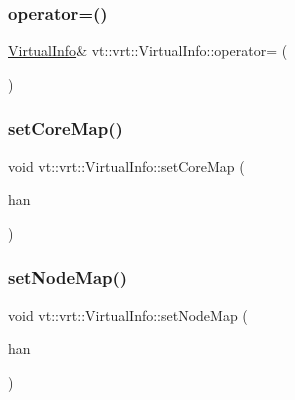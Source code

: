 \mbox{\label{structvt_1_1vrt_1_1_virtual_info_a63b12c1dfcbc3c6d34be9100c704dd81}} 
\subsubsection{\texorpdfstring{operator=()}{operator=()}}
{\footnotesize\ttfamily \hyperlink{structvt_1_1vrt_1_1_virtual_info}{Virtual\+Info}\& vt\+::vrt\+::\+Virtual\+Info\+::operator= (\begin{DoxyParamCaption}\item[{\hyperlink{structvt_1_1vrt_1_1_virtual_info}{Virtual\+Info} const \&}]{ }\end{DoxyParamCaption})\hspace{0.3cm}{\ttfamily [delete]}}

\mbox{\label{structvt_1_1vrt_1_1_virtual_info_ad2bc75966ac3a5c7faaf14bfe47b5ba4}} 
\subsubsection{\texorpdfstring{set\+Core\+Map()}{setCoreMap()}}
{\footnotesize\ttfamily void vt\+::vrt\+::\+Virtual\+Info\+::set\+Core\+Map (\begin{DoxyParamCaption}\item[{\hyperlink{namespacevt_af64846b57dfcaf104da3ef6967917573}{Handler\+Type} const}]{han }\end{DoxyParamCaption})\hspace{0.3cm}{\ttfamily [inline]}}

\mbox{\label{structvt_1_1vrt_1_1_virtual_info_acb0b673b07b17b8eb83a91168e6c5658}} 
\subsubsection{\texorpdfstring{set\+Node\+Map()}{setNodeMap()}}
{\footnotesize\ttfamily void vt\+::vrt\+::\+Virtual\+Info\+::set\+Node\+Map (\begin{DoxyParamCaption}\item[{\hyperlink{namespacevt_af64846b57dfcaf104da3ef6967917573}{Handler\+Type} const}]{han }\end{DoxyParamCaption})\hspace{0.3cm}{\ttfamily [inline]}}

